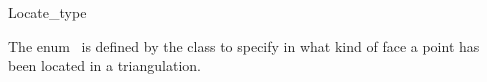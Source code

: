 \ccModifierCrossRefOff
\begin{ccRefEnum}[Triangulation::]{Locate_type}

\ccDefinition
  
The enum \ccRefName\ is defined by the class  to specify 
in what kind of face a point has been located in a triangulation.

{}

\ccSeeAlso


\end{ccRefEnum}
\ccModifierCrossRefOn
